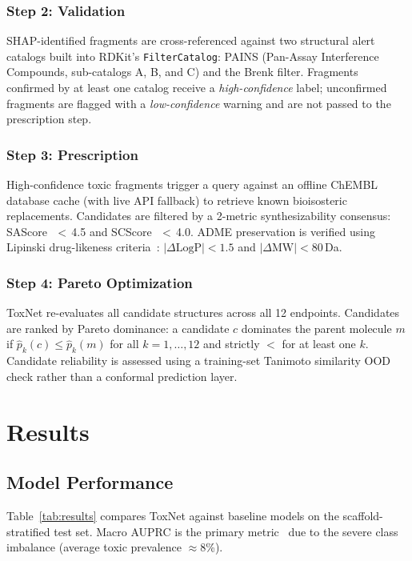 \documentclass[lettersize,journal]{IEEEtran}
\begin{document}
  \subsubsection{Step 2: Validation}
  SHAP-identified fragments are cross-referenced against two structural alert
  catalogs built into RDKit's \texttt{FilterCatalog}: PAINS (Pan-Assay Interference
  Compounds, sub-catalogs A, B, and C) and the Brenk filter.
  Fragments confirmed by at least one catalog receive a \textit{high-confidence}
  label; unconfirmed fragments are flagged with a \textit{low-confidence} warning
  and are not passed to the prescription step.

\subsubsection{Step 3: Prescription}
High-confidence toxic fragments trigger a query against an offline ChEMBL
database cache (with live API fallback) to retrieve known bioisosteric replacements.
Candidates are filtered by a 2-metric synthesizability consensus:
SAScore~\cite{ertl2009sascore}\,$<$\,4.5 and SCScore~\cite{coley2018scscore}\,$<$\,4.0.
ADME preservation is verified using Lipinski drug-likeness criteria~\cite{lipinski2001}:
$|\Delta\text{LogP}| < 1.5$ and $|\Delta\text{MW}| < 80$\,Da.

\subsubsection{Step 4: Pareto Optimization}
ToxNet re-evaluates all candidate structures across all 12 endpoints.
Candidates are ranked by Pareto dominance: a candidate $c$ dominates the
parent molecule $m$ if $\hat{p}_{k}(c) \leq \hat{p}_{k}(m)$ for all
$k = 1,\ldots,12$ and strictly $<$ for at least one $k$.
Candidate reliability is assessed using a training-set Tanimoto similarity
OOD check rather than a conformal prediction layer.

  \section{Results}

  \subsection{Model Performance}
  Table~\ref{tab:results} compares ToxNet against baseline models on the
  scaffold-stratified test set.
  Macro AUPRC is the primary metric~\cite{davis2006} due to the severe class imbalance
  (average toxic prevalence $\approx$8\%).
\end{document}
